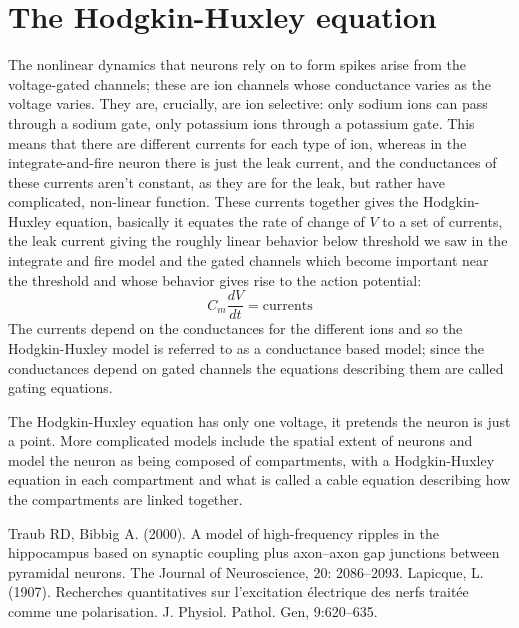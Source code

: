 \documentclass[11pt,a4paper]{scrartcl}
\begin{document}
\section*{The Hodgkin-Huxley equation}

The nonlinear dynamics that neurons rely on to form spikes arise from
the voltage-gated channels; these are ion channels whose
conductance varies as the voltage varies. They are, crucially, are ion
selective: only sodium ions can pass through a sodium gate, only
potassium ions through a potassium gate. This means that there are
different currents for each type of ion, whereas in the
integrate-and-fire neuron there is just the leak current, and the
conductances of these currents aren't constant, as they are for the
leak, but rather have complicated, non-linear function.  These
currents together gives the Hodgkin-Huxley equation, basically it
equates the rate of change of $V$ to a set of currents, the leak
current giving the roughly linear behavior below threshold we saw in
the integrate and fire model and the gated channels which become
important near the threshold and whose behavior gives rise to the
action potential:
\begin{equation}
C_m\frac{dV}{dt}=\mbox{currents}
\end{equation}
The currents depend on the conductances for the different ions and so
the Hodgkin-Huxley model is referred to as a conductance based model;
since the conductances depend on gated channels the equations
describing them are called gating equations.

The Hodgkin-Huxley equation has only one voltage, it pretends the
neuron is just a point. More complicated models include the spatial
extent of neurons and model the neuron as being composed of
compartments, with a Hodgkin-Huxley equation in each compartment and
what is called a cable equation describing how the compartments are
linked together.


\begin{thebibliography}{10}

Traub RD, Bibbig A. (2000). A model of high-frequency ripples in the hippocampus based on synaptic coupling plus axon–axon gap junctions between pyramidal neurons. 
\newblock The Journal of Neuroscience, 20: 2086--2093.
Lapicque, L. (1907). 
\newblock Recherches quantitatives sur l'excitation électrique des nerfs traitée comme une polarisation. 
\newblock J. Physiol. Pathol. Gen, 9:620--635.

\end{thebibliography}
\end{document}
